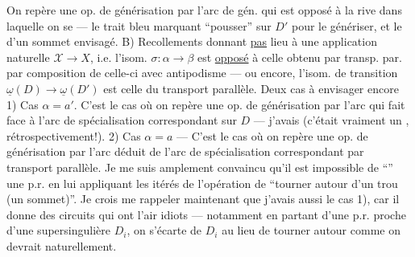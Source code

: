 On repère une op. de générisation par  l'arc de gén. qui est opposé à la rive dans laquelle on se  --- le trait bleu marquant  ``pousser'' sur $D'$ pour le génériser, et le  d'un sommet envisagé.
B) Recollements  donnant \uline{pas} lieu à une application naturelle $\mathcal X\longrightarrow X$, i.e. l'isom. $\sigma:\alpha\longrightarrow\beta$ est \uline{opposé} à celle obtenu par transp. par.  par composition de celle-ci avec antipodisme --- ou encore, l'isom. de transition $\underline\omega(D)\longrightarrow\underline\omega(D')$ est  celle du transport parallèle. Deux cas à envisager encore
1) Cas $\alpha=a'$. C'est le cas où on repère une op. de générisation  par l'arc qui fait face à l'arc de spécialisation correspondant sur $D$ ---   j'avais  (c'était vraiment un , rétrospectivement!).
2) Cas $\alpha=a$ --- C'est le cas où on repère une op. de générisation par l'arc  déduit de l'arc de spécialisation correspondant par transport parallèle. Je me suis amplement convaincu qu'il est impossible de ``'' une p.r. en lui appliquant les itérés de l'opération \unsure{$\rho$|$\varphi$} de ``tourner autour d'un trou (un sommet\unsure{\ldots})''.
Je crois me rappeler maintenant que j'avais  aussi le cas 1), car il donne  des circuits qui ont l'air idiots --- notamment en partant d'une p.r. proche d'une supersingulière $D_i$, on s'écarte de $D_i$ au lieu de tourner autour comme on devrait naturellement.
